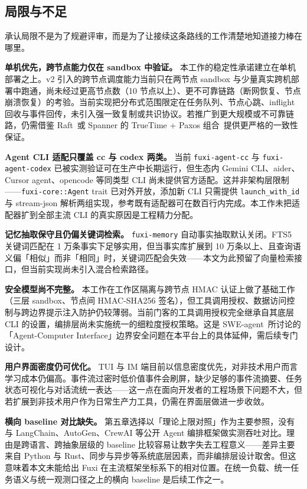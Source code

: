 \subsection{局限与不足}
\label{subsec:limitations}

承认局限不是为了规避评审，而是为了让接续这条路线的工作清楚地知道接力棒在哪里。

\textbf{单机优先，跨节点能力仅在 sandbox 中验证。} 本工作的稳定性承诺建立在单机部署之上。v2 引入的跨节点调度能力当前只在两节点 sandbox 与少量真实跨机部署中跑通，尚未经过更高节点数（10 节点以上）、更不可靠链路（断网恢复、节点崩溃恢复）的考验。当前实现把分布式范围限定在任务队列、节点心跳、inflight 回收与事件回传，未引入强一致复制或共识协议。若推广到更大规模或不可靠链路，仍需借鉴 Raft~\parencite{ongaro2014raft}或 Spanner 的 TrueTime + Paxos 组合~\parencite{corbett2012spanner}提供更严格的一致性保证。

\textbf{Agent CLI 适配只覆盖 cc 与 codex 两类。} 当前 \texttt{fuxi-agent-cc} 与 \texttt{fuxi-agent-codex} 已被实测验证可在生产中长期运行，但生态内 Gemini CLI、aider、Cursor agent、opencode 等同类型 CLI 尚未提供官方适配。这并非架构层限制——\texttt{fuxi-core::Agent} trait 已对外开放，添加新 CLI 只需提供 \texttt{launch\_with\_id} 与 stream-json 解析两组实现，参考既有适配器可在数百行内完成。本工作未把适配器扩到全部主流 CLI 的真实原因是工程精力分配。

\textbf{记忆抽取保守且仍偏关键词检索。} \texttt{fuxi-memory} 自动事实抽取默认关闭。FTS5 关键词匹配在 1 万条事实下足够实用，但当事实库扩展到 10 万条以上、且查询语义偏「相似」而非「相同」时，关键词匹配会失效——本文为此预留了向量检索接口，但当前实现尚未引入混合检索路径。

\textbf{安全模型尚不完整。} 本工作在工作区隔离与跨节点 HMAC 认证上做了基础工作（三层 sandbox、节点间 HMAC-SHA256 签名），但工具调用授权、数据访问控制与跨边界提示注入防护仍较薄弱。当前门客的工具调用授权完全继承自其底层 CLI 的设置，编排层尚未实施统一的细粒度授权策略。这是 SWE-agent~\parencite{yang2024sweagent}所讨论的「Agent-Computer Interface」边界安全问题在本平台上的具体延伸，需后续专门设计。

\textbf{用户界面密度仍可优化。} TUI 与 IM 端目前以信息密度优先，对非技术用户而言学习成本仍偏高。事件流过密时低价值事件会刷屏，缺少足够的事件流摘要、任务状态可视化与对话流统一表达——这一点在面向开发者的工程场景下问题不大，但若扩展到非技术用户作为日常生产力工具，仍需在界面层做进一步收敛。

\textbf{横向 baseline 对比缺失。} 第五章选择以「理论上限对照」作为主要参照，没有与 LangChain、AutoGen、CrewAI 等公开 Agent 编排框架做实测吞吐对比。理由是跨语言、跨抽象层级的 baseline 比较容易让数字失去工程意义——差异主要来自 Python 与 Rust、同步与异步等系统底层因素，而非编排层设计取舍。但这意味着本文未能给出 Fuxi 在主流框架坐标系下的相对位置。在统一负载、统一任务语义与统一观测口径之上的横向 baseline 是后续工作之一。

